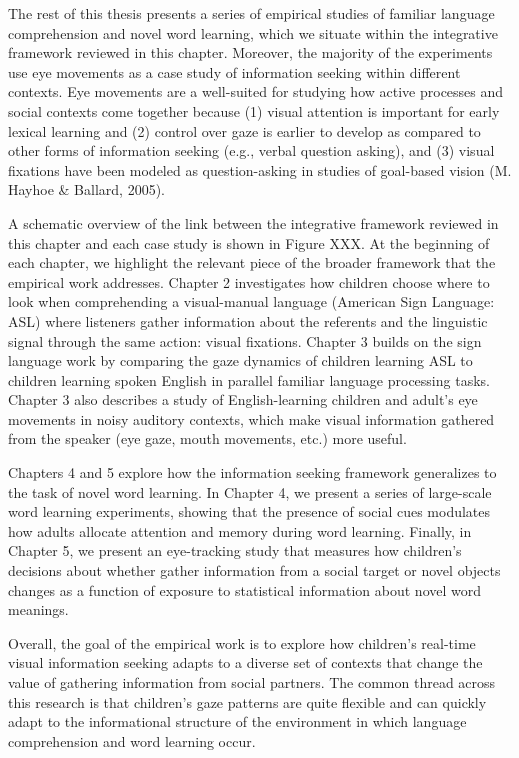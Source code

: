 \documentclass[oneside]{report}
\begin{document}
The rest of this thesis presents a series of empirical studies of
familiar language comprehension and novel word learning, which we
situate within the integrative framework reviewed in this chapter.
Moreover, the majority of the experiments use eye movements as a case
study of information seeking within different contexts. Eye movements
are a well-suited for studying how active processes and social contexts
come together because (1) visual attention is important for early
lexical learning and (2) control over gaze is earlier to develop as
compared to other forms of information seeking (e.g., verbal question
asking), and (3) visual fixations have been modeled as question-asking
in studies of goal-based vision (M. Hayhoe \& Ballard, 2005).

A schematic overview of the link between the integrative framework
reviewed in this chapter and each case study is shown in Figure XXX. At
the beginning of each chapter, we highlight the relevant piece of the
broader framework that the empirical work addresses. Chapter 2
investigates how children choose where to look when comprehending a
visual-manual language (American Sign Language: ASL) where listeners
gather information about the referents and the linguistic signal through
the same action: visual fixations. Chapter 3 builds on the sign language
work by comparing the gaze dynamics of children learning ASL to children
learning spoken English in parallel familiar language processing tasks.
Chapter 3 also describes a study of English-learning children and
adult's eye movements in noisy auditory contexts, which make visual
information gathered from the speaker (eye gaze, mouth movements, etc.)
more useful.

Chapters 4 and 5 explore how the information seeking framework
generalizes to the task of novel word learning. In Chapter 4, we present
a series of large-scale word learning experiments, showing that the
presence of social cues modulates how adults allocate attention and
memory during word learning. Finally, in Chapter 5, we present an
eye-tracking study that measures how children's decisions about whether
gather information from a social target or novel objects changes as a
function of exposure to statistical information about novel word
meanings.

Overall, the goal of the empirical work is to explore how children's
real-time visual information seeking adapts to a diverse set of contexts
that change the value of gathering information from social partners. The
common thread across this research is that children's gaze patterns are
quite flexible and can quickly adapt to the informational structure of
the environment in which language comprehension and word learning occur.
\end{document}
